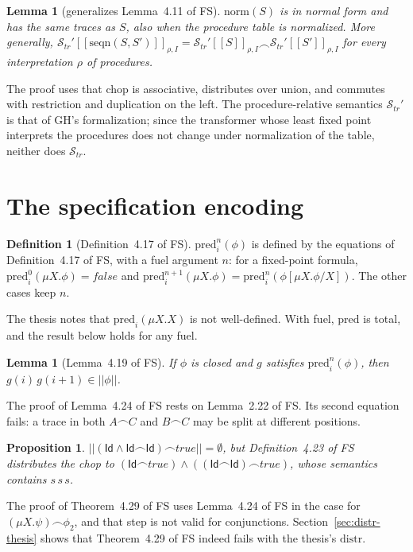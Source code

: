 \documentclass[11pt]{article}
\newcommand{\sem}[1]{[\![ #1 ]\!]}
\newcommand{\fsem}[1]{|\!|#1|\!|}
\newcommand{\Str}{{\mathcal{S}_{\mathit{tr}}}}
\newcommand{\chop}{\smallfrown}
\newcommand{\Id}{\mathsf{Id}}
\newcommand{\pred}{\mathrm{pred}}
\newcommand{\distr}{\mathrm{distr}}
\newcommand{\norm}{\mathrm{norm}}
\newcommand{\seqn}{\mathrm{seqn}}
\newcommand{\Th}[1]{#1 of FS}
\theoremstyle{plain}
\newtheorem{lemma}[theorem]{Lemma}
\newtheorem{proposition}[theorem]{Proposition}
\theoremstyle{definition}
\newtheorem{definition}[theorem]{Definition}
\theoremstyle{remark}
\begin{document}
\begin{lemma}[generalizes \Th{Lemma~4.11}]\label{lem:norm}
  $\norm(S)$ is in normal form and has the same traces as $S$, also when
  the procedure table is normalized. More generally,
  $\Str'\sem{\seqn(S, S')}_{\rho,I} =
  \Str'\sem{S}_{\rho,I} \chop \Str'\sem{S'}_{\rho,I}$ for every
  interpretation $\rho$ of procedures.
\end{lemma}

The proof uses that chop is associative, distributes over union, and
commutes with restriction and duplication on the left. The
procedure-relative semantics $\Str'$ is that of GH's formalization; since
the transformer whose least fixed point interprets the procedures does
not change under normalization of the table, neither does $\Str$.

\section{The specification encoding}

\begin{definition}[\Th{Definition~4.17}]
  $\pred^n_i(\phi)$ is defined by the equations of \Th{Definition~4.17},
  with a fuel argument $n$: for a fixed-point formula,
  $\pred^0_i(\mu X.\phi) = \mathit{false}$ and
  $\pred^{n+1}_i(\mu X.\phi) = \pred^n_i(\phi[\mu X.\phi/X])$. The other
  cases keep $n$.
\end{definition}

The thesis notes that $\pred_i(\mu X.X)$ is not well-defined. With fuel,
$\pred$ is total, and the result below holds for any fuel.

\begin{lemma}[\Th{Lemma~4.19}]\label{lem:pred}
  If $\phi$ is closed and $g$ satisfies $\pred^n_i(\phi)$, then
  $g(i)\,g(i+1) \in \fsem{\phi}$.
\end{lemma}

The proof of \Th{Lemma~4.24} rests on \Th{Lemma~2.22}. Its second
equation fails: a trace in both $A\chop C$ and $B\chop C$ may be split at
different positions.

\begin{proposition}\label{prop:distr}
  $\fsem{(\Id \land \Id\chop\Id)\chop \mathit{true}} = \emptyset$, but
  \Th{Definition~4.23} distributes the chop to
  $(\Id\chop\mathit{true}) \land ((\Id\chop\Id)\chop\mathit{true})$, whose
  semantics contains $s\,s\,s$.
\end{proposition}

The proof of \Th{Theorem~4.29} uses \Th{Lemma~4.24} in the case for
$(\mu X.\psi)\chop\phi_2$, and that step is not valid for conjunctions.
Section~\ref{sec:distr-thesis} shows that \Th{Theorem~4.29} indeed fails
with the thesis's $\distr$.
\end{document}
